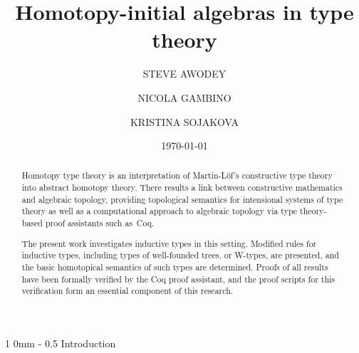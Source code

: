 \documentclass[10pt,a4paper,oneside,reqno]{amsart}
\makeatletter
\numberwithin{equation}{section}
\renewcommand{\section}{\@startsection
  {section}%
   {1}%
  {0mm}%
   {-\baselineskip}%
  {0.5\baselineskip}%
   {\Large\bfseries}}%
\theoremstyle{mythm}
\theoremstyle{mydef}
\theoremstyle{myrmk}
\makeatother
\begin{document}
\title{Homotopy-initial algebras in type theory}
\author[S. Awodey]{STEVE AWODEY}
\address{Carnegie Mellon University}
\author[N. Gambino]{NICOLA GAMBINO}
\address{School of Mathematics, University of Leeds}
\author[K. Sojakova]{KRISTINA SOJAKOVA}
\address{Carnegie Mellon University}
\date{\today}



\begin{abstract}
Homotopy type theory is an interpretation of Martin-L\"of's constructive type theory into abstract homotopy theory.   There results a link between constructive mathematics and algebraic topology, providing topological semantics for intensional systems of type theory as well as a computational approach to algebraic topology via type theory-based proof assistants such as~Coq.

The present work investigates inductive types in this setting. Modified rules for inductive types, including types of well-founded trees, or W-types, are presented, and the basic homotopical semantics of such types are determined.  Proofs of all results have been formally verified by the Coq proof assistant, and the proof scripts for this verification form an essential component of this research.      
\end{abstract}


\maketitle



\begin{small}
\tableofcontents
\end{small}

\section{Introduction}
\end{document}
